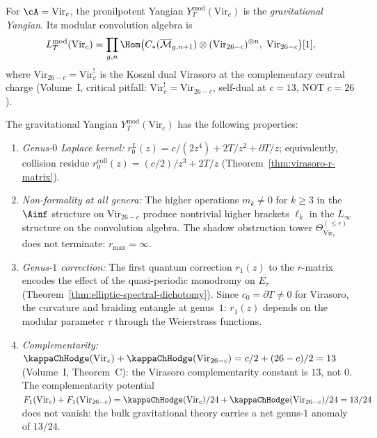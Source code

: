 \begin{definition}
For $\cA = \mathrm{Vir}_c$, the pronilpotent Yangian
$Y_T^{\mathrm{mod}}(\mathrm{Vir}_c)$ is the \emph{gravitational
Yangian}. Its modular convolution algebra is
\[
L_T^{\mathrm{mod}}(\mathrm{Vir}_c)
= \prod_{g,n}
\Hom\bigl(
C_\ast(\overline{\mathcal{M}}_{g,n+1})
\otimes (\mathrm{Vir}_{26-c})^{\otimes n},\;
\mathrm{Vir}_{26-c}
\bigr)[1],
\]
where $\mathrm{Vir}_{26-c} = \mathrm{Vir}_c^!$ is the Koszul
dual Virasoro at the complementary central charge
(Volume~I, critical pitfall: $\mathrm{Vir}_c^! = \mathrm{Vir}_{26-c}$,
self-dual at $c = 13$, NOT $c = 26$).
\end{definition}

\begin{proposition}
The gravitational Yangian
$Y_T^{\mathrm{mod}}(\mathrm{Vir}_c)$ has the following properties:
\begin{enumerate}[label=\textup{(\roman*)}]
\item \emph{Genus-$0$ Laplace kernel:}
$r^L_0(z) = c/(2z^4) + 2T/z^2 + \partial T/z$;
equivalently, collision residue
$r^{\mathrm{coll}}_0(z) = (c/2)/z^3 + 2T/z$
(Theorem~\ref{thm:virasoro-r-matrix}).

\item \emph{Non-formality at all genera:}
The higher operations $m_k \ne 0$ for $k \ge 3$ in the $\Ainf$
structure on $\mathrm{Vir}_{26-c}$ produce nontrivial higher
brackets $\ell_k$ in the $L_\infty$ structure on the convolution
algebra. The shadow obstruction tower $\Theta_{\mathrm{Vir}_c}^{(\le r)}$
does not terminate: $r_{\max} = \infty$.

\item \emph{Genus-$1$ correction:}
The first quantum correction $r_1(z)$ to the $r$-matrix encodes
the effect of the quasi-periodic monodromy on $E_\tau$
(Theorem~\ref{thm:elliptic-spectral-dichotomy}). Since
$c_0 = \partial T \ne 0$ for Virasoro, the curvature and
braiding entangle at genus~$1$: $r_1(z)$ depends on the
modular parameter $\tau$ through the Weierstrass functions.

\item \emph{Complementarity:}
$\kappaChHodge(\mathrm{Vir}_c) + \kappaChHodge(\mathrm{Vir}_{26-c}) = c/2 + (26-c)/2 = 13$
(Volume~I, Theorem~C): the Virasoro complementarity constant
is $13$, not $0$. The complementarity potential
$F_1(\mathrm{Vir}_c) + F_1(\mathrm{Vir}_{26-c})
= \kappaChHodge(\mathrm{Vir}_c)/24
+ \kappaChHodge(\mathrm{Vir}_{26-c})/24 = 13/24$
does not vanish: the bulk gravitational theory carries a net
genus-$1$ anomaly of $13/24$.
\end{enumerate}
\end{proposition}

